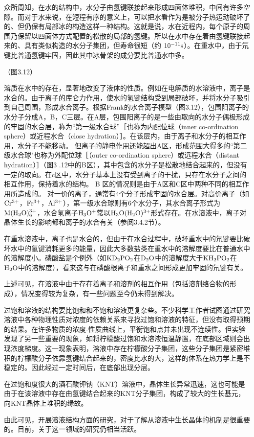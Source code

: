 众所周知，在水的结构中，水分子由氢键联接起来形成四面体堆积，中间有许多空隙。而对于水来说，在短程有序的意义上，可以把水看作为是被分子热运动破坏了的、但仍保有局部冰的构造这样一种结构。这就是说，水在近程内，每个原子的周围乃保留以四面体方式配置的松散的局部的氢键。所以在水中存在着由氢键联接起来的、具有类似构造的水分子集团，但寿命很短（约 $\rm 10^{-11}s$）。在重水中，由于氘键比普通氢键牢固，因此其中冰骨架的成分要比普通水中多。

（图3.12）

溶质在水中的存在，显著地改变了液体的性质。例如在电解质的水溶液中，离子是水合的。由于离子的库仑力作用，使水的氢键结构受到局部破坏，并将水分子吸引到自己周围，形成水合离子。根据Frank的水合离子模型（图3.12），包围阳离子的水分子分成A，B，C三层。在A层，包围阳离子的是一些由取向的水分子偶极形成的牢固的水合层，称为“第一级水合球”［也称为内配位球（inner co-ordination sphere）或近程水合（close hydration）］。在该层内，由于离子和水分子的相互作用，水分子不能移动。 但离子的静电作用还能超出A区，形成范围大得多的“第二级水合球"也称为外配位球［（outer co-ordination sphere）或远程水合（distant hydration）］（图3 .12中的B区），其中包含的水分子是松散地结合起来的，但没有一定的取向。在c区中，水分子基本上没有受到离子的干扰，只存在水分子之间的相互作用，保持着水的结构。 B 区的情况则是由于A区和C区中两种不同的相互作用所造成的。 对一价的离子，通常有4个分子形成牢固的水合层。对高价离子（如$\rm Cr^{3+}$，$\rm Fe^{3+}$，$\rm Al^{3+}$），第一级水合球则有6个水分子，其水合离子形式为$\rm M(H_2O)_6^{3+}$，水合氢离子$\rm H_3O^+$常以$\rm H_3O(H_2O)^{3+}$形式存在。在水溶液中，离子对晶体生长的影响都和离子的水合有关（参阅3.4.2节）。

在重水溶液中，离子也是水合的，但由于在水合过程中，破坏重水中的氘键要比破坏水中的氢键消耗更多的能量，因此大多数盐类在重水中的溶解度要比在普通水中的溶解度小。磷酸盐是个例外（如$\rm KD_2PO_2$在$\rm D_2O$中的溶解度大于$\rm KH_2PO_2$在$\rm H_2O$中的溶解度），看来这与在磷酸根离子和重水之间形成更加牢固的氘键有关。

上述可见，在溶液中由于存在着离子和溶剂的相互作用（包括溶剂络合物的形成），情况变得较为复杂，有一些问题至今仍未得到解决。

过饱和溶液的结构要比饱和和不饱和溶液更复杂些。不少科学工作者试图通过研究溶液中各种物理性质对浓度的依赖关系来寻找过饱和溶液的特征，但没有取得预期的结果。在许多物质的浓度-性质曲线上，平衡饱和点并未出现不连续性。但实验发现了另一些重要的现象，如将柠檬酸过饱和水溶液恒温静置，在底部区域则会出现浓度梯度。这一现象表明，溶液中存在柠檬酸分子集团，这些分子集团是紧密堆积的柠檬酸分子依靠氢键结合起来的，密度比水的大，这样的体系在热力学上是不稳定的。因此经过一定时间后，在底部出现分层。

在过饱和度很大的酒石酸钾钠（KNT）溶液中，晶体生长异常迅速，这也可能是由于在该溶液中存在由氢键结合起来的KNT分子集团，构成了较大的生长基元，向KNT晶体上堆积的缘故。 

由此可见，开展溶液结构方面的研究，对于了解从溶液中生长晶体的机制是很重要的。目前，关于这一领域的研究仍相当活跃。
